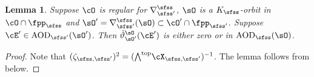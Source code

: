 \documentclass[12pt,a4paper]{amsart}
\numberwithin{equation}{section}
\newtheorem{lem}[thm]{Lemma}
\theoremstyle{remark}
\def\cOp{\cO^{\prime}}
\begin{document}
\def\wedgetop{{\bigwedge}^{\mathrm{top}}}


\medskip
\def\dlift{{\check \vartheta}}
\def\AOD{\mathrm{AOD}}

\begin{lem}\label{lem:aod}
  Suppose $\cO$ is regular for $\DDss$, $\sO$ is a $\Ks$-orbit in $\cO\cap \fpps$ and
  $\sOp = \DDss(\sO)\subset \cOp\cap \fppsp$.
  Suppose $\cE' \in \AOD_{\sfss'}(\sOp)$.
  Then $\dlift_{\sO'}^{\sO}(\cE')$ is either zero or in $\AOD_{\sfss}(\sO)$.
\end{lem}
\begin{proof}
  Note that $(\zeta_{\sfss,\sfss'})^{2} = (\wedgetop \CXss)^{-1}$.
   The lemma follows from  below.
\end{proof}
\end{document}
